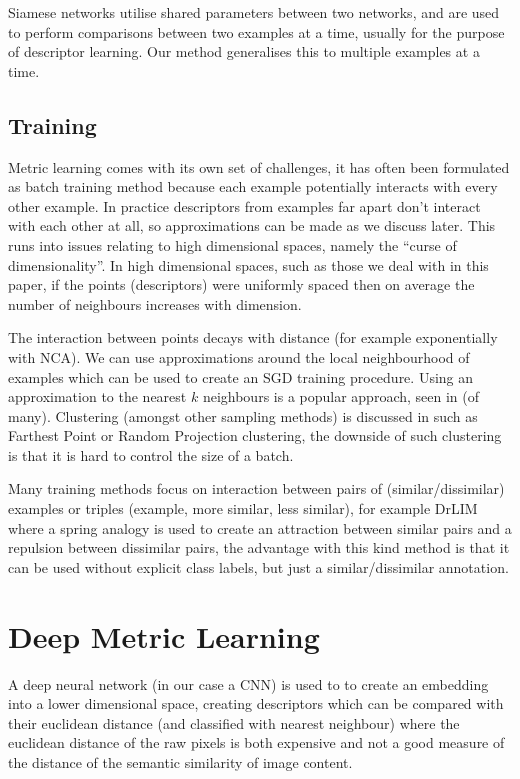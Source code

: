 Siamese networks utilise shared parameters between two networks, and are used to perform comparisons between two examples at a time, usually for the purpose of descriptor learning. Our method generalises this to multiple examples at a time.

\subsection {Training}

Metric learning comes with its own set of challenges, it has often been formulated as batch training method because each example potentially interacts with every other example. In practice descriptors from examples far apart don't interact with each other at all, so approximations can be made as we discuss later. This runs into issues relating to high dimensional spaces, namely the ``curse of dimensionality''. In high dimensional spaces, such as those we deal with in this paper, if the points (descriptors) were uniformly spaced then on average the number of neighbours increases with dimension. 

The interaction between points decays with distance (for example exponentially with \gls{NCA}). We can use approximations around the local neighbourhood of examples which can be used to create an \gls{SGD} training procedure. Using an approximation to the nearest $ k $ neighbours is a popular approach, seen in \cite{Mensink2012,Zaidi2011} (of many). Clustering (amongst other sampling methods) is discussed in  \cite{Oneat2011} such as Farthest Point or Random Projection clustering, the downside of such clustering is that it is hard to control the size of a batch. 

Many training methods focus on interaction between pairs of (similar/dissimilar) examples or triples (example, more similar, less similar), for example DrLIM \cite{Hadsell2006} where a spring analogy is used to create an attraction between similar pairs and a repulsion between dissimilar pairs, the advantage with this kind method is that it can be used without explicit class labels, but just a similar/dissimilar annotation.

\section {Deep Metric Learning}

A deep neural network (in our case a \gls{CNN}) is used to to create an embedding into a lower dimensional space, creating descriptors which can be compared with their euclidean distance (and classified with nearest neighbour) where the euclidean distance of the raw pixels is both expensive and not a good measure of the distance of the semantic similarity of image content. 

